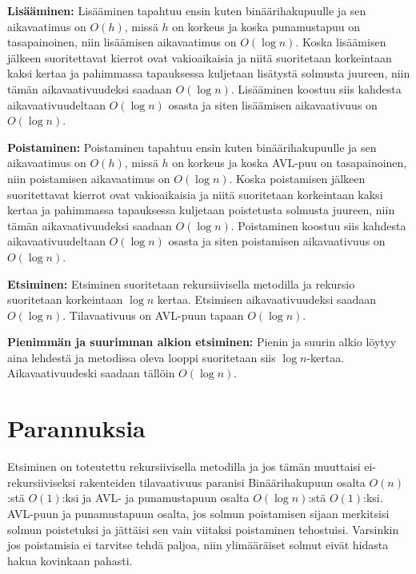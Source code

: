 \documentclass[12pt,a4paper,leqno,titlepage,twoside]{article}
\begin{document}
\begin{description}
\item{\textbf{Lisääminen:}} Lisääminen tapahtuu ensin kuten binäärihakupuulle
ja sen aikavaatimus on $O(h)$, missä $h$ on korkeus ja koska punamustapuu on tasapainoinen,
niin lisäämisen aikavaatimus on $O(\log n)$. Koska lisäämisen jälkeen suoritettavat
kierrot ovat vakioaikaisia ja niitä suoritetaan korkeintaan kaksi kertaa ja pahimmassa
tapauksessa kuljetaan lisätystä solmusta juureen, niin tämän aikavaativuudeksi
saadaan $O(\log n)$. Lisääminen koostuu siis kahdesta aikavaativuudeltaan $O(\log n)$
osasta ja siten lisäämisen aikavaativuus on $O(\log n)$.

\item{\textbf{Poistaminen:}} Poistaminen tapahtuu ensin kuten binäärihakupuulle
ja sen aikavaatimus on $O(h)$, missä $h$ on korkeus ja koska AVL-puu on tasapainoinen,
niin poistamisen aikavaatimus on $O(\log n)$. Koska poistamisen jälkeen suoritettavat
kierrot ovat vakioaikaisia ja niitä suoritetaan korkeintaan kaksi kertaa ja pahimmassa
tapauksessa kuljetaan poistetusta solmusta juureen, niin tämän aikavaativuudeksi
saadaan $O(\log n)$. Poistaminen koostuu siis kahdesta aikavaativuudeltaan $O(\log n)$
osasta ja siten poistamisen aikavaativuus on $O(\log n)$.

\item{\textbf{Etsiminen:}} Etsiminen suoritetaan rekursiivisella metodilla ja
rekursio suoritetaan korkeintaan $\log n$ kertaa. Etsimisen aikavaativuudeksi
saadaan $O(\log n)$. Tilavaativuus on AVL-puun tapaan $O(\log n)$.

\item{\textbf{Pienimmän ja suurimman alkion etsiminen:}} Pienin ja suurin alkio
löytyy aina lehdestä ja metodissa oleva looppi suoritetaan siis $\log n$-kertaa.
Aikavaativuudeski saadaan tällöin $O(\log n)$.
\end{description}

\section*{Parannuksia}

Etsiminen on toteutettu rekursiivisella metodilla ja jos tämän muuttaisi 
ei-rekursiiviseksi rakenteiden tilavaativuus paranisi Binäärihakupuun osalta $O(n)$:stä 
$O(1)$:ksi ja AVL- ja punamustapuun osalta $O(\log n)$:stä $O(1)$:ksi.
AVL-puun ja punamustapuun osalta, jos solmun poistamisen sijaan merkitsisi
solmun poistetuksi ja jättäisi sen vain viitaksi poistaminen tehostuisi. Varsinkin
jos poistamisia ei tarvitse tehdä paljoa, niin ylimääräiset solmut eivät hidasta
hakua kovinkaan pahasti.
\end{document}
